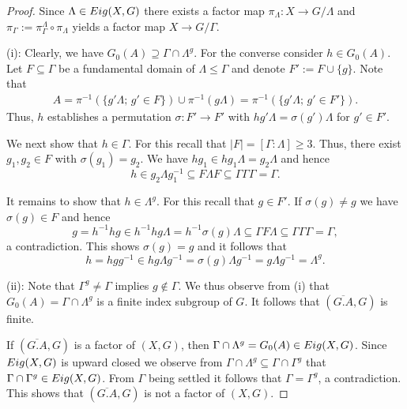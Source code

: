 \documentclass[10pt,a4paper]{amsart}
\def\Eig{{\rm Eig}}
\begin{document}
\begin{proof}
    Since $\Lambda\in \Eig(X,G)$ there exists a factor map $\pi_\Lambda\colon X\to G/\Lambda$ and $\pi_\Gamma:=\pi^\Lambda_\Gamma\circ \pi_\Lambda$ yields a factor map $X\to G/\Gamma$. 

(i):
    Clearly, we have $G_0(A)\supseteq \Gamma\cap \Lambda^g$. 
    For the converse consider $h\in G_0(A)$. 
    Let $F\subseteq \Gamma$ be a fundamental domain of $\Lambda\leq \Gamma$ and denote
    $F':=F\cup \{g\}$.
    Note that
    \begin{align*}
        A
        =\pi^{-1}(\{g'\Lambda;\, g'\in F\}) \cup \pi^{-1}(g\Lambda)
        =\pi^{-1}\left(\{g'\Lambda;\, g'\in F'\}\right). 
    \end{align*}
    Thus, $h$ establishes a permutation $\sigma\colon F'\to F'$ with 
    $hg'\Lambda=\sigma(g')\Lambda$ for $g'\in F'$. 

    We next show that $h\in \Gamma$. 
    For this recall that $|F|=[\Gamma\colon \Lambda]\geq 3$.    
    Thus, there exist $g_1,g_2\in F$ with $\sigma(g_1)=g_2$. 
    We have $hg_1\in hg_1\Lambda = g_2\Lambda$ and hence 
    \[h\in g_2\Lambda g_1^{-1}\subseteq F\Lambda F\subseteq\Gamma\Gamma\Gamma=\Gamma.\] 

    It remains to show that $h\in \Lambda^g$. 
    For this recall that $g\in F'$. 
    If $\sigma(g)\neq g$ we have $\sigma(g)\in F$ and hence 
    \[g
    =h^{-1}hg\in h^{-1}hg\Lambda
    =h^{-1}\sigma(g)\Lambda
    \subseteq \Gamma F \Lambda
    \subseteq \Gamma\Gamma\Gamma=\Gamma,\]
    a contradiction. 
    This shows $\sigma(g)=g$ and it follows that
    \[h=hgg^{-1}\in hg\Lambda g^{-1}=\sigma(g)\Lambda g^{-1}=g\Lambda g^{-1}=\Lambda^g.\]

(ii):
    Note that $\Gamma^g\neq \Gamma$ implies $g\notin \Gamma$. 
    We thus observe from (i) that $G_0(A)=\Gamma\cap \Lambda^g$ is a finite index subgroup of $G$. 
    It follows that $(\overline{G.A},G)$ is finite. 

    If $(\overline{G.A},G)$ is a factor of $(X,G)$, then 
    $\Gamma\cap \Lambda^g=G_0(A)\in \Eig(X,G)$. 
    Since $\Eig(X,G)$ is upward closed we observe from 
    $\Gamma\cap \Lambda^g\subseteq \Gamma\cap \Gamma^g$ that 
    $\Gamma\cap \Gamma^g\in \Eig(X,G)$.
    From $\Gamma$ being settled it follows that $\Gamma=\Gamma^g$, a contradiction. 
    This shows that $(\overline{G.A},G)$ is not a factor of $(X,G)$. 
\end{proof}
\end{document}
